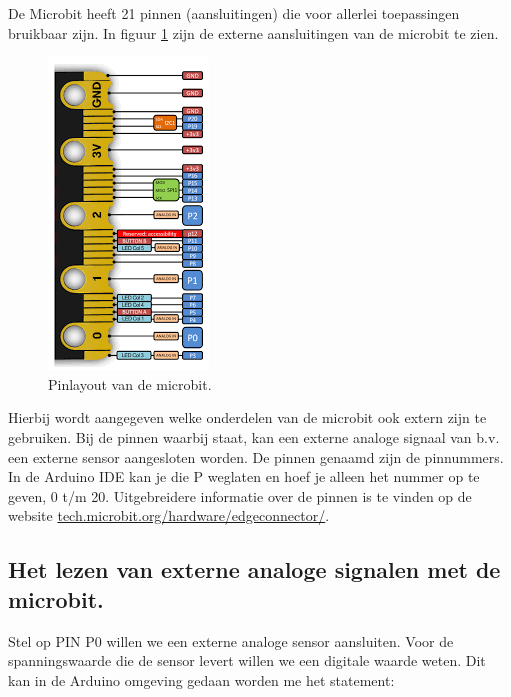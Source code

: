 De Microbit heeft 21 pinnen (aansluitingen) die voor allerlei toepassingen bruikbaar zijn. In figuur \ref{fig:ardPinB} zijn de externe aansluitingen van de microbit te zien. 
\begin{figure}[h!]
	\captionsetup{justification=centering}
	\includegraphics[width=0.4 \linewidth]{figuren/microbitCon}
	\centering
	\caption{Pinlayout van de microbit.}
	\label{fig:ardPinB}
\end{figure}
Hierbij wordt aangegeven welke onderdelen van de microbit ook extern zijn te gebruiken. Bij de pinnen waarbij  staat, kan een externe analoge signaal van b.v. een externe sensor aangesloten worden. De pinnen genaamd  zijn de pinnummers. In de Arduino IDE kan je die P weglaten en hoef je alleen het nummer op te geven, 0 t/m 20. Uitgebreidere informatie over de pinnen is te vinden op de website \href{https://tech.microbit.org/hardware/edgeconnector/}{tech.microbit.org/hardware/edgeconnector/}.\\

\subsection{Het lezen van externe analoge signalen met de microbit.}

Stel op PIN P0 willen we een externe analoge sensor aansluiten. Voor de spanningswaarde die de sensor levert willen we een digitale waarde weten. 
Dit kan in de Arduino omgeving gedaan worden me het statement:\\

